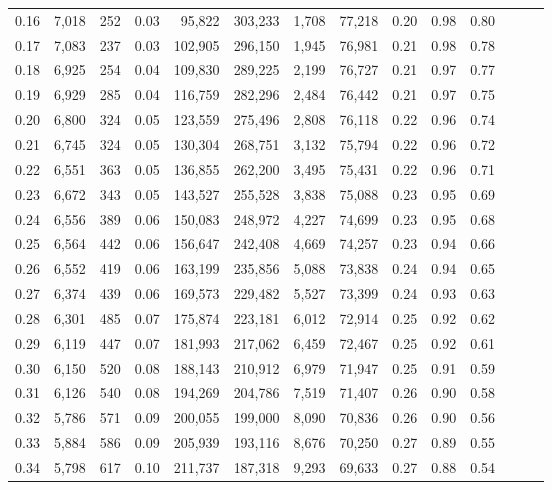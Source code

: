 \begin{tabular}{rrrrrrrrrrrrrr}
0.16 &  7,018 &    252 &  0.03 &   95,822 &  303,233 &   1,708 &  77,218 &  0.20 &  0.98 &      0.80 \\
0.17 &  7,083 &    237 &  0.03 &  102,905 &  296,150 &   1,945 &  76,981 &  0.21 &  0.98 &      0.78 \\
0.18 &  6,925 &    254 &  0.04 &  109,830 &  289,225 &   2,199 &  76,727 &  0.21 &  0.97 &      0.77 \\
0.19 &  6,929 &    285 &  0.04 &  116,759 &  282,296 &   2,484 &  76,442 &  0.21 &  0.97 &      0.75 \\
0.20 &  6,800 &    324 &  0.05 &  123,559 &  275,496 &   2,808 &  76,118 &  0.22 &  0.96 &      0.74 \\
0.21 &  6,745 &    324 &  0.05 &  130,304 &  268,751 &   3,132 &  75,794 &  0.22 &  0.96 &      0.72 \\
0.22 &  6,551 &    363 &  0.05 &  136,855 &  262,200 &   3,495 &  75,431 &  0.22 &  0.96 &      0.71 \\
0.23 &  6,672 &    343 &  0.05 &  143,527 &  255,528 &   3,838 &  75,088 &  0.23 &  0.95 &      0.69 \\
0.24 &  6,556 &    389 &  0.06 &  150,083 &  248,972 &   4,227 &  74,699 &  0.23 &  0.95 &      0.68 \\
0.25 &  6,564 &    442 &  0.06 &  156,647 &  242,408 &   4,669 &  74,257 &  0.23 &  0.94 &      0.66 \\
0.26 &  6,552 &    419 &  0.06 &  163,199 &  235,856 &   5,088 &  73,838 &  0.24 &  0.94 &      0.65 \\
0.27 &  6,374 &    439 &  0.06 &  169,573 &  229,482 &   5,527 &  73,399 &  0.24 &  0.93 &      0.63 \\
0.28 &  6,301 &    485 &  0.07 &  175,874 &  223,181 &   6,012 &  72,914 &  0.25 &  0.92 &      0.62 \\
0.29 &  6,119 &    447 &  0.07 &  181,993 &  217,062 &   6,459 &  72,467 &  0.25 &  0.92 &      0.61 \\
0.30 &  6,150 &    520 &  0.08 &  188,143 &  210,912 &   6,979 &  71,947 &  0.25 &  0.91 &      0.59 \\
0.31 &  6,126 &    540 &  0.08 &  194,269 &  204,786 &   7,519 &  71,407 &  0.26 &  0.90 &      0.58 \\
0.32 &  5,786 &    571 &  0.09 &  200,055 &  199,000 &   8,090 &  70,836 &  0.26 &  0.90 &      0.56 \\
0.33 &  5,884 &    586 &  0.09 &  205,939 &  193,116 &   8,676 &  70,250 &  0.27 &  0.89 &      0.55 \\
0.34 &  5,798 &    617 &  0.10 &  211,737 &  187,318 &   9,293 &  69,633 &  0.27 &  0.88 &      0.54 \\

\end{tabular}
